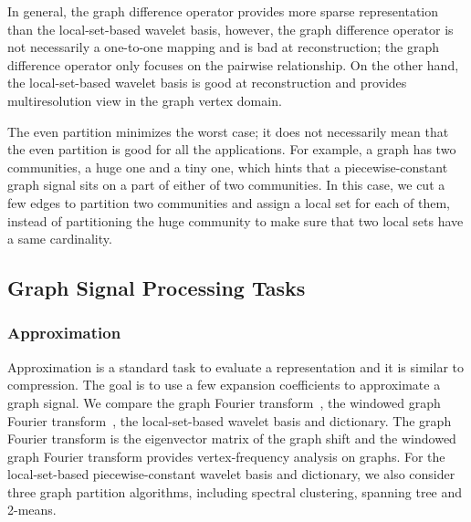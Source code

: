 \documentclass[journal,twocolumn,10pt]{IEEEtran}
\theoremstyle{definition}
\begin{document}
In general, the graph difference operator provides more sparse representation than the local-set-based wavelet basis, however, the graph difference operator is not necessarily a one-to-one mapping and is bad at reconstruction; the graph difference operator only focuses on the pairwise relationship. On the other hand, the local-set-based wavelet basis is good at reconstruction and provides multiresolution view in the graph vertex domain.

The even partition minimizes the worst case; it does not necessarily mean that the even partition is good for all the applications. For example, a graph has two communities, a huge one and a tiny one, which hints that a piecewise-constant graph signal sits on a part of either of two communities. In this case, we cut a few edges to partition two communities and assign a local set for each of them, instead of partitioning the huge community to make sure that two local sets have a same cardinality.




\subsection{Graph Signal Processing Tasks}

\subsubsection{Approximation}
\label{sec:pc_app}
Approximation is a standard task to evaluate a representation and it is similar to compression. The goal is to use a few expansion coefficients to approximate a graph signal. We compare the graph Fourier transform~\cite{SandryhailaM:13}, the windowed graph Fourier transform~\cite{ShumanRV:15}, the local-set-based wavelet basis and dictionary. The graph Fourier transform is the eigenvector matrix of the graph shift and the windowed graph Fourier transform provides vertex-frequency analysis on graphs. For the local-set-based piecewise-constant wavelet basis and dictionary, we also consider three graph partition algorithms, including spectral clustering, spanning tree and 2-means.
\end{document}
